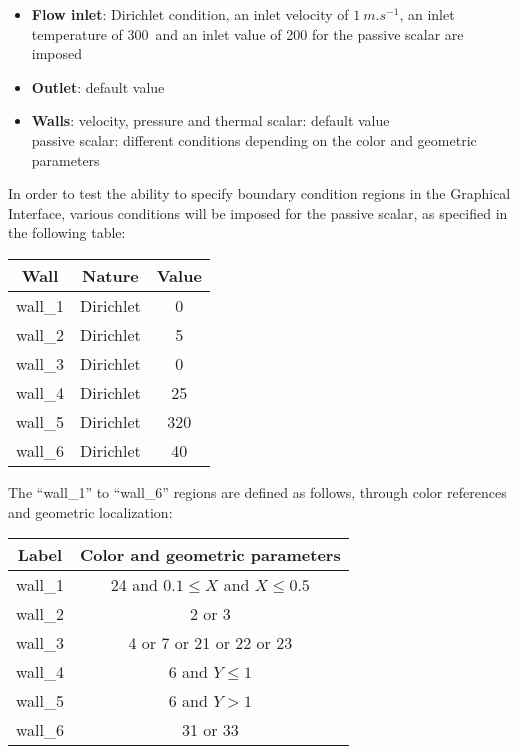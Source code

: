 \begin{itemize}
	\item {\bfseries Flow inlet}: Dirichlet condition, an inlet velocity of
$1\ m.s^{-1}$, an inlet temperature of 300\degresC\ and an inlet value of 200
for the passive scalar are imposed
	\item {\bfseries Outlet}: default value
	\item {\bfseries Walls}: velocity, pressure and thermal scalar: default value \\
	            \hspace*{1.25cm} passive scalar: different conditions
depending on the color and geometric parameters
\end{itemize}

In order to test the ability to specify boundary condition regions in the
Graphical Interface, various conditions will be imposed for the passive scalar,
as specified in the following table:

\begin{center}
\begin{tabular}{|c|c|c|}
\hline
Wall & Nature & Value \\
\hline 
wall\_1 & Dirichlet  & 0 \\ 
\hline 
wall\_2 & Dirichlet  & 5 \\ 
\hline 
wall\_3 & Dirichlet  & 0 \\ 
\hline 
wall\_4 & Dirichlet  & 25 \\ 
\hline 
wall\_5 & Dirichlet  & 320 \\ 
\hline 
wall\_6 & Dirichlet  & 40 \\ 
\hline
\end{tabular} 
\end{center}

The ``wall\_1'' to ``wall\_6'' regions are defined as follows, through color
references and geometric localization:
\begin{center}
\begin{tabular}{c|c}
Label & Color and geometric parameters \\
\hline
wall\_1 & 24 and $0.1\leqslant X$ and $X\leqslant 0.5$ \\
wall\_2 & 2 or 3 \\
wall\_3 & 4 or 7 or 21 or 22 or 23 \\
wall\_4 & 6 and $Y\leqslant1$ \\
wall\_5 & 6 and $Y>1$ \\
wall\_6 & 31 or 33 \\
\end{tabular}
\end{center}

